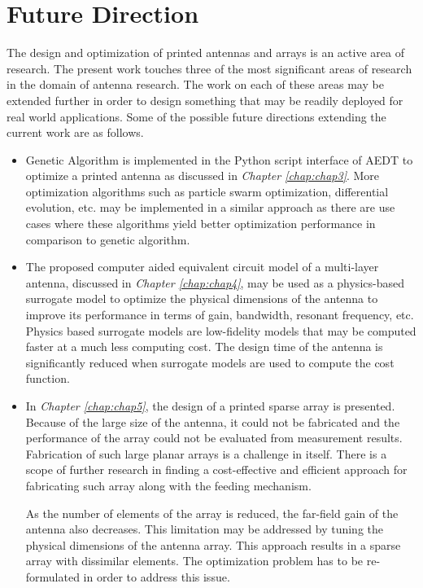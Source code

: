 \section{Future Direction}\label{c6sec_future}
The design and optimization of printed antennas and arrays is an active area of research. The present work touches three of the most significant areas of research in the domain of antenna research. The work on each of these areas may be extended further in order to design something that may be readily deployed for real world applications. Some of the possible future directions extending the current work are as follows.
\begin{itemize}
\item Genetic Algorithm is implemented in the Python script interface of AEDT to optimize a printed antenna as discussed in \emph{Chapter \ref{chap:chap3}}. More optimization algorithms such as particle swarm optimization, differential evolution, etc. may be implemented in a similar approach as there are use cases where these algorithms yield better optimization performance in comparison to genetic algorithm.
\item The proposed computer aided equivalent circuit model of a multi-layer antenna, discussed in \emph{Chapter \ref{chap:chap4}}, may be used as a physics-based surrogate model to optimize the physical dimensions of the antenna to improve its performance in terms of gain, bandwidth, resonant frequency, etc. Physics based surrogate models are low-fidelity models that may be computed faster at a much less computing cost. The design time of the antenna is significantly reduced when surrogate models are used to compute the cost function.
\item In  \emph{Chapter \ref{chap:chap5}}, the design of a printed sparse array is presented. Because of the large size of the antenna, it could not be fabricated and the performance of the array could not be evaluated from measurement results. Fabrication of such large planar arrays is a challenge in itself. There is a scope of further research in finding a cost-effective and efficient approach for fabricating such array along with the feeding mechanism.
    
    As the number of elements of the array is reduced, the far-field gain of the antenna also decreases. This limitation may be addressed by tuning the physical dimensions of the antenna array. This approach results in a sparse array with dissimilar elements. The optimization problem has to be re-formulated in order to address this issue.
\end{itemize} 